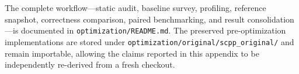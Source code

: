 \documentclass[twoside,11pt]{article}
\begin{document}
\noindent
The complete workflow---static audit, baseline survey, profiling, reference
snapshot, correctness comparison, paired benchmarking, and result
consolidation---is documented in \texttt{optimization/README.md}. The
preserved pre-optimization implementations are stored under
\texttt{optimization/original/scpp\_original/} and remain importable, allowing
the claims reported in this appendix to be independently re-derived from a
fresh checkout.




\end{document}
